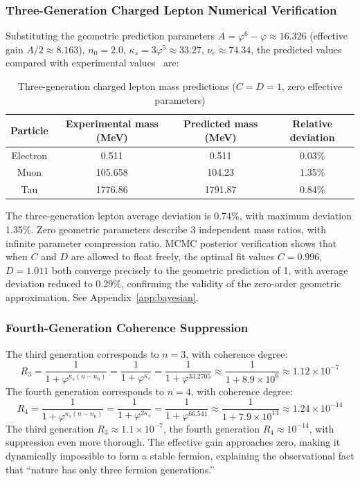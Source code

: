 \documentclass[12pt,a4paper,twocolumn]{article}
\renewcommand{\phi}{\varphi}
\begin{document}
\subsubsection{Three-Generation Charged Lepton Numerical Verification}
Substituting the geometric prediction parameters $A = \phi^6-\phi \approx 16.326$ (effective gain $A/2\approx 8.163$), $n_0=2.0$, $\kappa_s = 3\phi^5 \approx 33.27$, $\nu_e\approx 74.34$, the predicted values compared with experimental values~\cite{PDG2024} are:

\begin{table}[H]
\centering
\footnotesize
\caption{Three-generation charged lepton mass predictions ($C=D=1$, zero effective parameters)}
\begin{tabular}{c|c|c|c}
\hline
\textbf{Particle} & \textbf{Experimental mass (MeV)} & \textbf{Predicted mass (MeV)} & \textbf{Relative deviation} \\
\hline
Electron & 0.511 & 0.511 & 0.03\% \\
Muon & 105.658 & 104.23 & 1.35\% \\
Tau & 1776.86 & 1791.87 & 0.84\% \\
\hline
\end{tabular}
\end{table}

The three-generation lepton average deviation is 0.74\%, with maximum deviation 1.35\%. Zero geometric parameters describe 3 independent mass ratios, with infinite parameter compression ratio. MCMC posterior verification shows that when $C$ and $D$ are allowed to float freely, the optimal fit values $C=0.996$, $D=1.011$ both converge precisely to the geometric prediction of 1, with average deviation reduced to 0.29\%, confirming the validity of the zero-order geometric approximation. See Appendix~\ref{app:bayesian}.

\subsubsection{Fourth-Generation Coherence Suppression}
The third generation corresponds to $n=3$, with coherence degree:
\[
R_3 = \frac{1}{1+\phi^{\kappa_s(n-n_0)}} = \frac{1}{1+\phi^{\kappa_s}} = \frac{1}{1+\phi^{33.2705}} \approx \frac{1}{1+8.9\times 10^{6}} \approx 1.12 \times 10^{-7}
\]
The fourth generation corresponds to $n=4$, with coherence degree:
\[
R_4 = \frac{1}{1+\phi^{\kappa_s(n-n_0)}} = \frac{1}{1+\phi^{2\kappa_s}} = \frac{1}{1+\phi^{66.541}} \approx \frac{1}{1+7.9\times 10^{13}} \approx 1.24 \times 10^{-14}
\]
The third generation $R_3\approx1.1\times10^{-7}$, the fourth generation $R_4\approx10^{-14}$, with suppression even more thorough. The effective gain approaches zero, making it dynamically impossible to form a stable fermion, explaining the observational fact that ``nature has only three fermion generations.''
\end{document}
